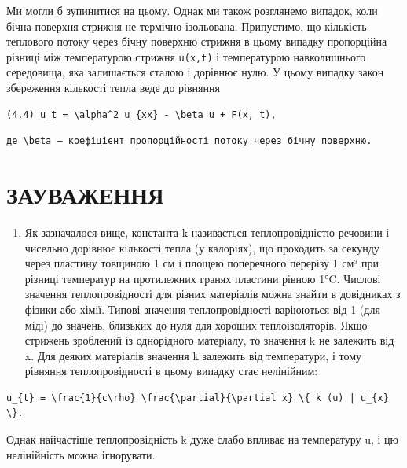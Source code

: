 \documentclass[
  ukrainian,
]{article}
\providecommand{\tightlist}{%
  \setlength{\itemsep}{0pt}\setlength{\parskip}{0pt}}
\begin{document}
Ми могли б зупинитися на цьому. Однак ми також розглянемо випадок, коли
бічна поверхня стрижня не термічно ізольована. Припустимо, що кількість
теплового потоку через бічну поверхню стрижня в цьому випадку
пропорційна різниці між температурою стрижня \texttt{u(x,t)} і
температурою навколишнього середовища, яка залишається сталою і дорівнює
нулю. У цьому випадку закон збереження кількості тепла веде до рівняння

\begin{verbatim}
(4.4) u_t = \alpha^2 u_{xx} - \beta u + F(x, t),
\end{verbatim}

\begin{verbatim}
де \beta — коефіцієнт пропорційності потоку через бічну поверхню.
\end{verbatim}

\section{ЗАУВАЖЕННЯ}\label{ux437ux430ux443ux432ux430ux436ux435ux43dux43dux44f-3}

\begin{enumerate}
\def\labelenumi{\arabic{enumi}.}
\tightlist
\item
  Як зазначалося вище, константа k називається теплопровідністю речовини
  і чисельно дорівнює кількості тепла (у калоріях), що проходить за
  секунду через пластину товщиною 1 см і площею поперечного перерізу 1
  см³ при різниці температур на протилежних гранях пластини рівною 1°C.
  Числові значення теплопровідності для різних матеріалів можна знайти в
  довідниках з фізики або хімії. Типові значення теплопровідності
  варіюються від 1 (для міді) до значень, близьких до нуля для хороших
  теплоізоляторів. Якщо стрижень зроблений із однорідного матеріалу, то
  значення k не залежить від x. Для деяких матеріалів значення k
  залежить від температури, і тому рівняння теплопровідності в цьому
  випадку стає нелінійним:
\end{enumerate}

\begin{verbatim}
u_{t} = \frac{1}{c\rho} \frac{\partial}{\partial x} \{ k (u) | u_{x} \}.
\end{verbatim}

Однак найчастіше теплопровідність k дуже слабо впливає на температуру u,
і цю нелінійність можна ігнорувати.
\end{document}
